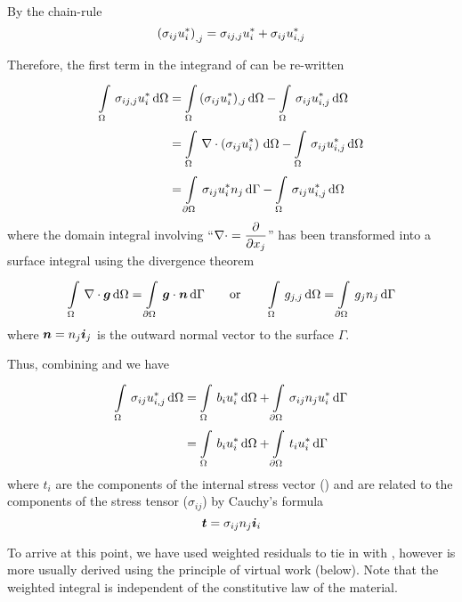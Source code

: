 By the chain-rule
\begin{displaymath}
  \left( \sigma_{ij}u_{i}^{*} \right)_{,j} = \sigma_{ij,j}u_{i}^{*} +
  \sigma_{ij}u_{i,j}^{*}
\end{displaymath}

Therefore, the first term in the integrand of  can be
re-written
\begin{align}
  \goneint{\sigma_{ij,j} u_{i}^{*}}{\Omega}
  &= \goneint{(\sigma_{ij} u_{i}^{*})_{,j}}{\Omega} - 
  \goneint{\sigma_{ij}u_{i,j}^{*}}{\Omega} \nonumber \\
  &= \goneint{\divergence{}{\pbrac{\sigma_{ij} u_{i}^{*} }}}{\Omega}
    - \goneint{\sigma_{ij} u_{i,j}^{*}}{\Omega} \nonumber\\
  &= \gint{\del \Omega}{}{\sigma_{ij} u_{i}^{*}n_{j}}{\Gamma}
  - \goneint{\sigma_{ij} u_{i,j}^{*}}{\Omega}
  \label{eqn:divtheory}
\end{align}
where the domain integral involving ``$\divergence{}{} = \delby{}{x_{j}}$'' has been
transformed into a surface integral using the divergence theorem
\begin{displaymath}
  \goneint{\divergence{}{\vectr{g}}}{\Omega} = \gint{\del
  \Omega}{}{\dotprod{\vectr{g}}{\vectr{n}}}{\Gamma} \qquad \text{or} \qquad
  \goneint{g_{j,j}}{\Omega} = \gint{\del \Omega}{}{g_{j} n_{j}}{\Gamma}
\end{displaymath}
where $ \boldsymbol{n}  = n_{j} \boldsymbol{i} _{j}$ is the outward normal vector to the
surface $\Gamma$.

Thus, combining  and  we have
\begin{align}
  \goneint{\sigma_{ij} u_{i,j}^{*}}{\Omega} &=
  \goneint{b_{i} u_{i}^{*}}{\Omega} + \gint{\del \Omega}{}
  {\sigma_{ij} n_{j}u_{i}^{*}}{\Gamma} \nonumber \\ &= \goneint
  {b_{i} u_{i}^{*}}{\Omega} + \gint{\del \Omega}{}{t_{i} u_{i}^{*}}{\Gamma}
  \label{eqn:virtws}
\end{align}
where $t_{i}$ are the components of the internal stress vector () and
are related to the components of the stress tensor ($\sigma_{ij}$) by Cauchy's
formula
\begin{equation}
 \boldsymbol{t}  = \sigma_{ij}n_{j} \boldsymbol{i} _{i}
\label{eqn:cauchyseqn}
\end{equation}

To arrive at this point, we have used weighted residuals to tie in with
, however  is more usually derived
using the principle of virtual work (below). Note that the weighted integral
 is independent of the constitutive law of the material.


